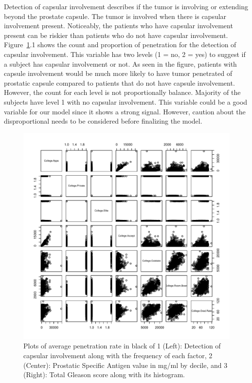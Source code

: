 \documentclass[11pt]{article}\usepackage[]{graphicx}\usepackage[]{color}
\makeatletter
\def\maxwidth{ %
  \ifdim\Gin@nat@width>\linewidth
    \linewidth
  \else
    \Gin@nat@width
  \fi
}
\makeatother
\begin{document}
\noindent Detection of capsular involvement describes if the tumor is involving or extending beyond the prostate capsule. The tumor is involved when there is capsular involvement present. Noticeably, the patients who have capsular involvement present can be riskier than patients who do not have capsular involvement. Figure~\ref{explore2}.1 shows the count and proportion of penetration for the detection of capsular involvement. This variable has two levels (1 = no, 2 = yes) to suggest if a subject has capsular involvement or not. As seen in the figure, patients with capsule involvement would be much more likely to have tumor penetrated of prostatic capsule compared to patients that do not have capsule involvement. However, the count for each level is not proportionally balance. Majority of the subjects have level 1 with no capsular involvement. This variable could be a good variable for our model since it shows a strong signal. However, caution about the disproportional needs to be considered before finalizing the model.      

\begin{figure}[h!] 
\begin{center}

\includegraphics[width=\maxwidth]{figure/unnamed-chunk-2-1} 

\caption{Plots of average penetration rate in black of 1 (Left): Detection of capsular involvement along with the frequency of each factor, 2 (Center): Prostatic Specific Antigen value in mg/ml by decile, and 3 (Right): Total Gleason score along with its histogram.}
\label{explore2}
\end{center} 
\end{figure}
\end{document}
